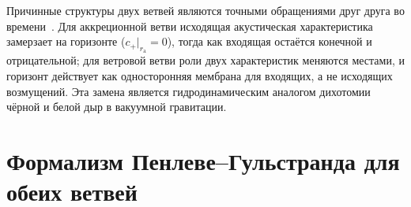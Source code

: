 \documentclass[12pt,a4paper,preprint]{elsarticle}
\begin{document}
            Причинные структуры двух ветвей являются точными обращениями друг друга во времени~\cite{SemyannikovAV_GlobalAcousticGeometryOfMichelFlowInPainleveGullstrandCoordinates_2026}. Для аккреционной ветви исходящая акустическая характеристика замерзает на горизонте ($c_{+}|_{r_{\mathrm{a}}} = 0$), тогда как входящая остаётся конечной и отрицательной; для ветровой ветви роли двух характеристик меняются местами, и горизонт действует как односторонняя мембрана для входящих, а не исходящих возмущений. Эта замена является гидродинамическим аналогом дихотомии чёрной и белой дыр в вакуумной гравитации.

    \section{Формализм Пенлеве--Гульстранда для обеих ветвей}\label{sec:pg-framework}
\end{document}
